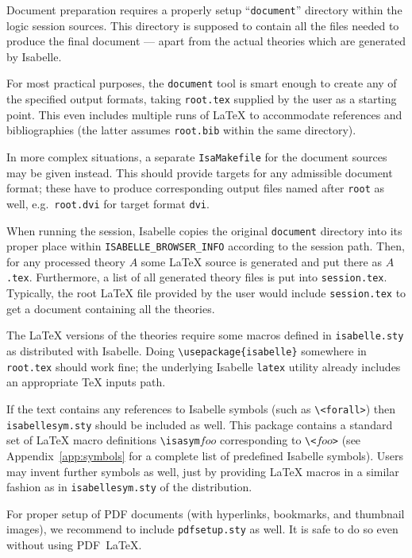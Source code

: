 \medskip Document preparation requires a properly setup ``\texttt{document}''
directory within the logic session sources.  This directory is supposed to
contain all the files needed to produce the final document --- apart from the
actual theories which are generated by Isabelle.

\medskip For most practical purposes, the \texttt{document} tool is smart
enough to create any of the specified output formats, taking \texttt{root.tex}
supplied by the user as a starting point.  This even includes multiple runs of
{\LaTeX} to accommodate references and bibliographies (the latter assumes
\texttt{root.bib} within the same directory).

In more complex situations, a separate \texttt{IsaMakefile} for the document
sources may be given instead.  This should provide targets for any admissible
document format; these have to produce corresponding output files named after
\texttt{root} as well, e.g.\ \texttt{root.dvi} for target format \texttt{dvi}.

\medskip When running the session, Isabelle copies the original
\texttt{document} directory into its proper place within
\texttt{ISABELLE_BROWSER_INFO} according to the session path.  Then, for any
processed theory $A$ some {\LaTeX} source is generated and put there as
$A$\texttt{.tex}.  Furthermore, a list of all generated theory files is put
into \texttt{session.tex}.  Typically, the root {\LaTeX} file provided by the
user would include \texttt{session.tex} to get a document containing all the
theories.

The {\LaTeX} versions of the theories require some macros defined in
\texttt{isabelle.sty} as distributed with Isabelle.  Doing
\verb,\usepackage{isabelle}, somewhere in \texttt{root.tex} should work fine;
the underlying Isabelle \texttt{latex} utility already includes an appropriate
{\TeX} inputs path.

If the text contains any references to Isabelle symbols (such as
\verb,\<forall>,) then \texttt{isabellesym.sty} should be included as well.
This package contains a standard set of {\LaTeX} macro definitions
\verb,\isasym,$foo$ corresponding to \verb,\<,$foo$\verb,>, (see
Appendix~\ref{app:symbols} for a complete list of predefined Isabelle
symbols).  Users may invent further symbols as well, just by providing
{\LaTeX} macros in a similar fashion as in \texttt{isabellesym.sty} of the
distribution.

For proper setup of PDF documents (with hyperlinks, bookmarks, and thumbnail
images), we recommend to include \verb,pdfsetup.sty, as well.  It is safe to
do so even without using PDF~\LaTeX.

